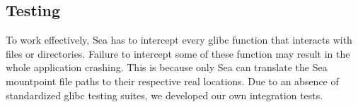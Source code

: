 





\subsection{Testing}
To work effectively, Sea has to intercept every glibc function that interacts with files or
directories. Failure to intercept some of these function may result in the whole application
crashing. This is because only Sea can translate the Sea mountpoint file paths to their
respective real locations. Due to an absence of standardized glibc testing suites,
we developed our own integration tests.

